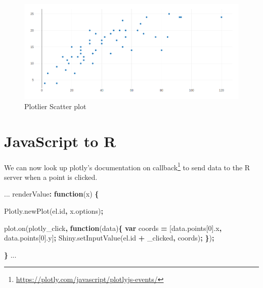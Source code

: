 \documentclass[
]{krantz}
\makeatletter
\newenvironment{Shaded}{\begin{snugshade}}{\end{snugshade}}
\newcommand{\AttributeTok}[1]{\textcolor[rgb]{0.61,0.61,0.61}{#1}}
\newcommand{\DecValTok}[1]{\textcolor[rgb]{0.06,0.06,0.06}{#1}}
\newcommand{\KeywordTok}[1]{\textcolor[rgb]{0.27,0.27,0.27}{\textbf{#1}}}
\newcommand{\NormalTok}[1]{#1}
\newcommand{\OperatorTok}[1]{\textcolor[rgb]{0.43,0.43,0.43}{\textbf{#1}}}
\newcommand{\StringTok}[1]{\textcolor[rgb]{0.5,0.5,0.5}{#1}}
\newcommand{\VariableTok}[1]{\textcolor[rgb]{0,0,0}{#1}}
\renewcommand{\href}[2]{#2\footnote{\url{#1}}}
\newenvironment{kframe}{%
\medskip{}
\setlength{\fboxsep}{.8em}
 \def\at@end@of@kframe{}%
 \ifinner\ifhmode%
  \def\at@end@of@kframe{\end{minipage}}%
  \begin{minipage}{\columnwidth}%
 \fi\fi%
 \def\FrameCommand##1{\hskip\@totalleftmargin \hskip-\fboxsep
 \colorbox{shadecolor}{##1}\hskip-\fboxsep
     \hskip-\linewidth \hskip-\@totalleftmargin \hskip\columnwidth}%
 \MakeFramed {\advance\hsize-\width
   \@totalleftmargin\z@ \linewidth\hsize
   \@setminipage}}%
 {\par\unskip\endMakeFramed%
 \at@end@of@kframe}
\renewenvironment{Shaded}{\begin{kframe}}{\end{kframe}}
\makeatother
\begin{document}
\begin{figure}
\centering
\includegraphics{images/plotlier-scatter.png}
\caption{Plotlier Scatter plot}
\end{figure}

\hypertarget{javascript-to-r}{%
\section{JavaScript to R}\label{javascript-to-r}}

We can now look up plotly's documentation on \href{https://plotly.com/javascript/plotlyjs-events/}{callback} to send data to the R server when a point is clicked.

\begin{Shaded}
\begin{Highlighting}[]
\NormalTok{...}
\NormalTok{renderValue}\OperatorTok{:} \KeywordTok{function}\NormalTok{(x) }\OperatorTok{\{}

  \VariableTok{Plotly}\NormalTok{.}\AttributeTok{newPlot}\NormalTok{(}\VariableTok{el}\NormalTok{.}\AttributeTok{id}\OperatorTok{,} \VariableTok{x}\NormalTok{.}\AttributeTok{options}\NormalTok{)}\OperatorTok{;}

  \VariableTok{plot}\NormalTok{.}\AttributeTok{on}\NormalTok{(}\StringTok{\textquotesingle{}plotly\_click\textquotesingle{}}\OperatorTok{,} \KeywordTok{function}\NormalTok{(data)}\OperatorTok{\{}
    \KeywordTok{var}\NormalTok{ coords }\OperatorTok{=}\NormalTok{ [}\VariableTok{data}\NormalTok{.}\AttributeTok{points}\NormalTok{[}\DecValTok{0}\NormalTok{].}\AttributeTok{x}\OperatorTok{,} \VariableTok{data}\NormalTok{.}\AttributeTok{points}\NormalTok{[}\DecValTok{0}\NormalTok{].}\AttributeTok{y}\NormalTok{]}\OperatorTok{;}
    \VariableTok{Shiny}\NormalTok{.}\AttributeTok{setInputValue}\NormalTok{(}\VariableTok{el}\NormalTok{.}\AttributeTok{id} \OperatorTok{+} \StringTok{\textquotesingle{}\_clicked\textquotesingle{}}\OperatorTok{,}\NormalTok{ coords)}\OperatorTok{;}
  \OperatorTok{\}}\NormalTok{)}\OperatorTok{;}

\OperatorTok{\}}
\NormalTok{...}
\end{Highlighting}
\end{Shaded}
\end{document}
